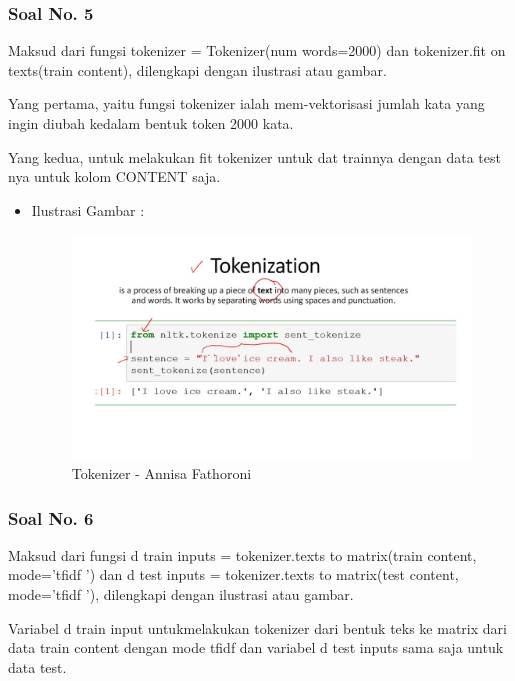 \subsubsection{Soal No. 5}
Maksud dari fungsi tokenizer = Tokenizer(num words=2000) dan tokenizer.fit on texts(train content), dilengkapi dengan ilustrasi atau gambar.

Yang pertama, yaitu fungsi tokenizer ialah mem-vektorisasi jumlah kata yang ingin diubah kedalam bentuk token 2000 kata.

Yang kedua, untuk melakukan fit tokenizer untuk dat trainnya dengan data test nya untuk kolom CONTENT saja.

\begin{itemize}
\item Ilustrasi Gambar :

\begin{figure}[!hbtp]
\centering
\includegraphics[scale=0.2]{figures/Chapter 7/1164067/Teori/Chapter7AnnisaFathoroni5.png}
\caption{Tokenizer - Annisa Fathoroni}
\label{Tokenizer - Annisa Fathoroni}
\end{figure}

\end{itemize}

\subsubsection{Soal No. 6}
Maksud dari fungsi d train inputs = tokenizer.texts to matrix(train content, mode=’tfidf ’) dan d test inputs = tokenizer.texts to matrix(test content, mode=’tfidf ’), dilengkapi dengan ilustrasi atau gambar.

Variabel d train input untukmelakukan tokenizer dari bentuk teks ke matrix dari data train content dengan mode tfidf dan variabel d test inputs sama saja untuk data test.

